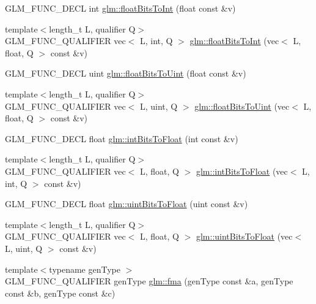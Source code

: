 \begin{DoxyCompactItemize}
\item 
G\+L\+M\+\_\+\+F\+U\+N\+C\+\_\+\+D\+E\+CL int \hyperlink{group__core__func__common_gadc6a536a7bef046c3293d2ccad6d9ca2}{glm\+::float\+Bits\+To\+Int} (float const \&v)
\item 
{\footnotesize template$<$length\+\_\+t L, qualifier Q$>$ }\\G\+L\+M\+\_\+\+F\+U\+N\+C\+\_\+\+Q\+U\+A\+L\+I\+F\+I\+ER vec$<$ L, int, Q $>$ \hyperlink{group__core__func__common_ga99f7d62f78ac5ea3b49bae715c9488ed}{glm\+::float\+Bits\+To\+Int} (vec$<$ L, float, Q $>$ const \&v)
\item 
G\+L\+M\+\_\+\+F\+U\+N\+C\+\_\+\+D\+E\+CL uint \hyperlink{group__core__func__common_ga748b4d2819b48d28ca09dc8733488873}{glm\+::float\+Bits\+To\+Uint} (float const \&v)
\item 
{\footnotesize template$<$length\+\_\+t L, qualifier Q$>$ }\\G\+L\+M\+\_\+\+F\+U\+N\+C\+\_\+\+Q\+U\+A\+L\+I\+F\+I\+ER vec$<$ L, uint, Q $>$ \hyperlink{group__core__func__common_ga49418ba4c8a60fbbb5d57b705f3e26db}{glm\+::float\+Bits\+To\+Uint} (vec$<$ L, float, Q $>$ const \&v)
\item 
G\+L\+M\+\_\+\+F\+U\+N\+C\+\_\+\+D\+E\+CL float \hyperlink{group__core__func__common_ga2650dc57b2148a6ffbce20944fb4d97a}{glm\+::int\+Bits\+To\+Float} (int const \&v)
\item 
{\footnotesize template$<$length\+\_\+t L, qualifier Q$>$ }\\G\+L\+M\+\_\+\+F\+U\+N\+C\+\_\+\+Q\+U\+A\+L\+I\+F\+I\+ER vec$<$ L, float, Q $>$ \hyperlink{group__core__func__common_ga7a0a8291a1cf3e1c2aee33030a1bd7b0}{glm\+::int\+Bits\+To\+Float} (vec$<$ L, int, Q $>$ const \&v)
\item 
G\+L\+M\+\_\+\+F\+U\+N\+C\+\_\+\+D\+E\+CL float \hyperlink{group__core__func__common_ga97464ca9ff4267de30ea408f700d4ca8}{glm\+::uint\+Bits\+To\+Float} (uint const \&v)
\item 
{\footnotesize template$<$length\+\_\+t L, qualifier Q$>$ }\\G\+L\+M\+\_\+\+F\+U\+N\+C\+\_\+\+Q\+U\+A\+L\+I\+F\+I\+ER vec$<$ L, float, Q $>$ \hyperlink{group__core__func__common_ga97f46b5f7b42fe44482e13356eb394ae}{glm\+::uint\+Bits\+To\+Float} (vec$<$ L, uint, Q $>$ const \&v)
\item 
{\footnotesize template$<$typename gen\+Type $>$ }\\G\+L\+M\+\_\+\+F\+U\+N\+C\+\_\+\+Q\+U\+A\+L\+I\+F\+I\+ER gen\+Type \hyperlink{group__core__func__common_gad0f444d4b81cc53c3b6edf5aa25078c2}{glm\+::fma} (gen\+Type const \&a, gen\+Type const \&b, gen\+Type const \&c)

\end{DoxyCompactItemize}
